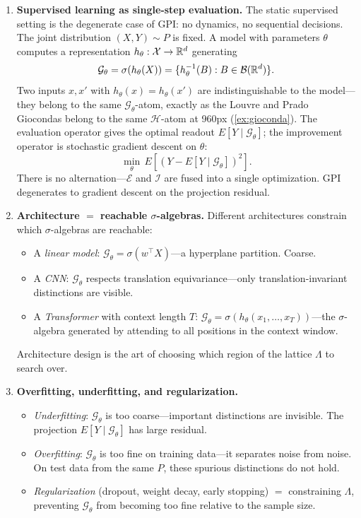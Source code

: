 \begin{example}
\begin{enumerate}[label=(\alph*)]
\item \textbf{Supervised learning as single-step evaluation.} The static supervised setting is the degenerate case of GPI: no dynamics, no sequential decisions. The joint distribution $(X, Y) \sim P$ is fixed. A model with parameters $\theta$ computes a representation $h_\theta : \mathcal{X} \to \mathbb{R}^d$ generating
\[
\mathcal{G}_\theta = \sigma(h_\theta(X)) = \{h_\theta^{-1}(B) : B \in \mathcal{B}(\mathbb{R}^d)\}.
\]
Two inputs $x, x'$ with $h_\theta(x) = h_\theta(x')$ are indistinguishable to the model---they belong to the same $\mathcal{G}_\theta$-atom, exactly as the Louvre and Prado Giocondas belong to the same $\mathcal{H}$-atom at 960px (\cref{ex:gioconda}). The evaluation operator gives the optimal readout $E[Y \mid \mathcal{G}_\theta]$; the improvement operator is stochastic gradient descent on $\theta$:
\begin{equation}\label{eq:ml-fundamental}
\min_\theta\, E[(Y - E[Y \mid \mathcal{G}_\theta])^2].
\end{equation}
There is no alternation---$\mathcal{E}$ and $\mathcal{I}$ are fused into a single optimization. GPI degenerates to gradient descent on the projection residual.

\item \textbf{Architecture $=$ reachable $\sigma$-algebras.} Different architectures constrain which $\sigma$-algebras are reachable:
\begin{itemize}
\item A \emph{linear model}: $\mathcal{G}_\theta = \sigma(w^\top X)$---a hyperplane partition. Coarse.
\item A \emph{CNN}: $\mathcal{G}_\theta$ respects translation equivariance---only translation-invariant distinctions are visible.
\item A \emph{Transformer} with context length $T$: $\mathcal{G}_\theta = \sigma(h_\theta(x_1, \ldots, x_T))$---the $\sigma$-algebra generated by attending to all positions in the context window.
\end{itemize}
Architecture design is the art of choosing which region of the lattice $\Lambda$ to search over.

\item \textbf{Overfitting, underfitting, and regularization.}
\begin{itemize}
\item \emph{Underfitting}: $\mathcal{G}_\theta$ is too coarse---important distinctions are invisible. The projection $E[Y \mid \mathcal{G}_\theta]$ has large residual.
\item \emph{Overfitting}: $\mathcal{G}_\theta$ is too fine on training data---it separates noise from noise. On test data from the same $P$, these spurious distinctions do not hold.
\item \emph{Regularization} (dropout, weight decay, early stopping) $=$ constraining $\Lambda$, preventing $\mathcal{G}_\theta$ from becoming too fine relative to the sample size.
\end{itemize}


\end{enumerate}
\end{example}
